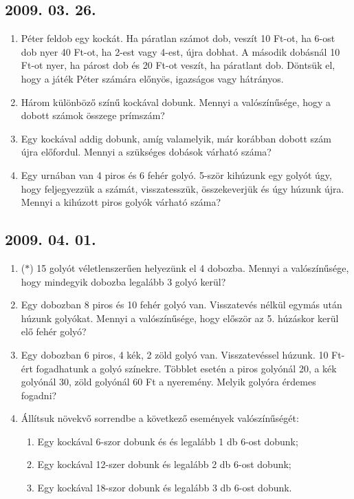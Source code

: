 \documentclass{article}
\newenvironment{abc}{\begin{enumerate}[label=\textit{\alph*})]}{\end{enumerate}}
\begin{document}
\subsection*{2009. 03. 26.}
\begin{enumerate}
\item Péter feldob egy kockát. Ha páratlan számot dob, veszít 10 Ft-ot, ha 6-ost dob nyer 40 Ft-ot, ha 2-est vagy 4-est, újra dobhat. A második dobásnál 10 Ft-ot nyer, ha párost dob és 20 Ft-ot veszít, ha páratlant dob. Döntsük el, hogy a játék Péter számára előnyös, igazságos vagy hátrányos.

\item Három különböző színű kockával dobunk. Mennyi a valószínűsége, hogy a dobott számok összege prímszám?

\item Egy kockával addig dobunk, amíg valamelyik, már korábban dobott szám újra előfordul. Mennyi a szükséges dobások várható száma?

\item Egy urnában van 4 piros és 6 fehér golyó. 5-ször kihúzunk egy golyót úgy, hogy feljegyezzük a számát, visszatesszük, összekeverjük és úgy húzunk újra. Mennyi a kihúzott piros golyók várható száma?
\end{enumerate}
\subsection*{2009. 04. 01.}
\begin{enumerate}
\item ($*$) 15 golyót véletlenszerűen helyezünk el 4 dobozba. Mennyi a valószínűsége, hogy mindegyik dobozba legalább 3 golyó kerül? 

\item Egy dobozban 8 piros és 10 fehér golyó van. Visszatevés nélkül  egymás után húzunk golyókat. Mennyi a valószínűsége, hogy először az 5. húzáskor kerül elő fehér golyó?

\item Egy dobozban 6 piros, 4 kék, 2 zöld golyó van. Visszatevéssel húzunk. 10 Ft-ért fogadhatunk a golyó színekre. Többlet esetén a piros golyónál 20, a kék golyónál 30, zöld golyónál 60 Ft a nyeremény. Melyik golyóra érdemes fogadni? 

\item Állítsuk növekvő sorrendbe a következő események valószínűségét:
\begin{abc}
\item Egy kockával 6-szor dobunk és és legalább 1 db 6-ost dobunk;
\item Egy kockával 12-szer dobunk és legalább 2 db 6-ost dobunk;
\item Egy kockával 18-szor dobunk és legalább 3 db 6-ost dobunk.
\end{abc}
\end{enumerate}
\end{document}

